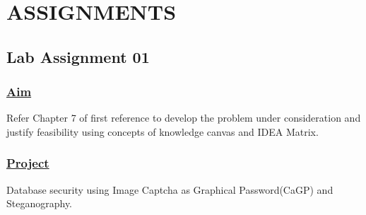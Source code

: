 \chapter{ASSIGNMENTS}
\vspace{0.5}
\section*{\centering\LARGE{Lab Assignment 01}}

\subsection*{\underline{Aim}}
Refer Chapter 7 of first reference to develop the problem under consideration and justify feasibility using concepts of knowledge canvas and IDEA Matrix. 
\subsection*{\underline{Project}}
Database security using Image Captcha as Graphical Password(CaGP) and Steganography.\\
